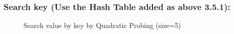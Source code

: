 \subsubsection{Search key (Use the Hash Table added as above 3.5.1):}
\begin{figure}[H]
	\centering
	\qquad
	\caption{Search value by key by Quadratic Probing (size=5)}%
\end{figure}

